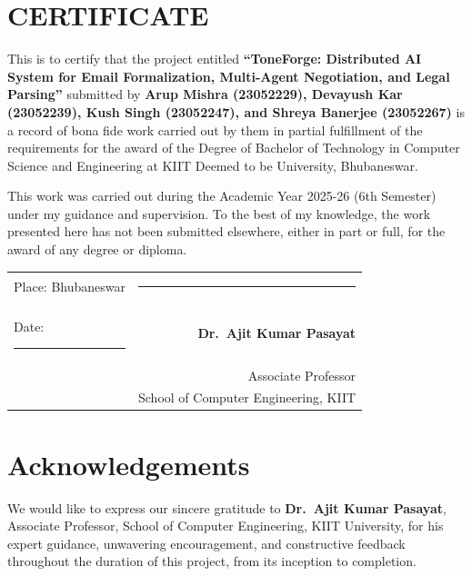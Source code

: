 \documentclass[12pt,a4paper]{report}
\begin{document}

\chapter*{CERTIFICATE}

This is to certify that the project entitled \textbf{``ToneForge: Distributed AI System for Email Formalization, Multi-Agent Negotiation, and Legal Parsing''} submitted by \textbf{Arup Mishra (23052229), Devayush Kar (23052239), Kush Singh (23052247), and Shreya Banerjee (23052267)} is a record of bona fide work carried out by them in partial fulfillment of the requirements for the award of the Degree of Bachelor of Technology in Computer Science and Engineering at KIIT Deemed to be University, Bhubaneswar.

This work was carried out during the Academic Year 2025-26 (6th Semester) under my guidance and supervision. To the best of my knowledge, the work presented here has not been submitted elsewhere, either in part or full, for the award of any degree or diploma.

\vspace{3cm}

\noindent
\begin{tabular*}{\textwidth}{@{\extracolsep{\fill}}lr}
	Place: Bhubaneswar & \rule{6cm}{0.4pt} \\
	Date: \rule{3cm}{0.4pt} & \textbf{Dr.\ Ajit Kumar Pasayat} \\
	& Associate Professor \\
	& School of Computer Engineering, KIIT \\
\end{tabular*}

\clearpage

\chapter*{Acknowledgements}

We would like to express our sincere gratitude to \textbf{Dr.\ Ajit Kumar Pasayat}, Associate Professor, School of Computer Engineering, KIIT University, for his expert guidance, unwavering encouragement, and constructive feedback throughout the duration of this project, from its inception to completion.
\end{document}
